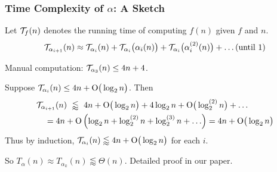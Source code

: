 \begin{frame}
\frametitle{Time Complexity of $\alpha$: A Sketch}

Let $\mathcal{T}_f(n)$ denotes the running time of computing $f(n)$ given $f$ and $n$.
\pause
\begin{equation*}
\mathcal{T}_{\alpha_{i+1}}(n) \approx
\mathcal{T}_{\alpha_i}(n) + \mathcal{T}_{\alpha_i}\big(\alpha_i(n)\big)
+ \mathcal{T}_{\alpha_i}\big(\alpha_i^{(2)}(n)\big) + \ldots (\text{until 1})
\end{equation*}

\smallskip

\pause
Manual computation: $\mathcal{T}_{\alpha_3}(n)\le 4n + 4$.

\smallskip

\pause
Suppose $\mathcal{T}_{\alpha_i}(n) \le 4n + \text{O}\big(\log_2n\big)$. \pause Then
\begin{equation*}
\begin{aligned}
& \mathcal{T}_{\alpha_{i+1}}(n) \ \lessapprox \ 4n + \text{O}\big(\log_2n\big) + 4\log_2n + \text{O}\big(\log_2^{(2)}n\big) + \ldots \\
& \quad = 4n + \text{O}\left(\log_2n + \log_2^{(2)}n + \log_2^{(3)}n + \ldots\right)
 = 4n + \text{O}\big(\log_2n\big)
\end{aligned}
\end{equation*}
\pause
Thus by induction, $\mathcal{T}_{\alpha_i}(n) \lessapprox 4n + \text{O}\big(\log_2n\big)$ for each $i$.

\bigskip

\pause
So $T_{\alpha}(n) \approx T_{\alpha_k}(n) \lessapprox \Theta(n)$. Detailed proof in our paper.

\end{frame}
